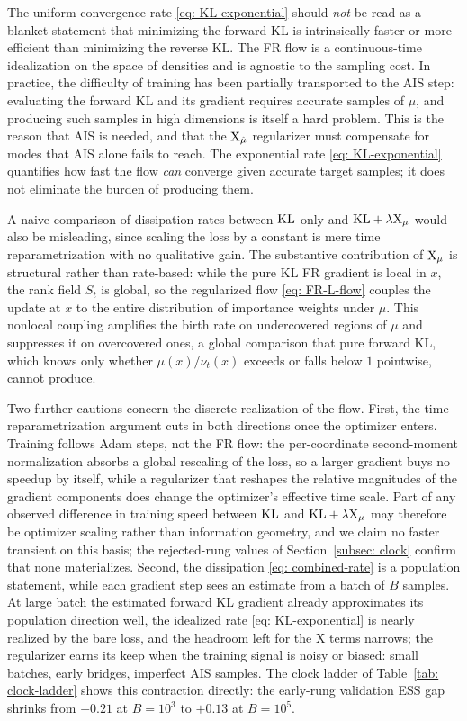 \documentclass{article}
\begin{document}
The uniform convergence rate \eqref{eq: KL-exponential} should \emph{not} be read as a blanket statement that minimizing the forward KL is intrinsically faster or more efficient than minimizing the reverse KL. The FR flow is a continuous-time idealization on the space of densities and is agnostic to the sampling cost. In practice, the difficulty of training has been partially transported to the AIS step: evaluating the forward KL and its gradient requires accurate samples of $\mu$, and producing such samples in high dimensions is itself a hard problem. This is the reason that AIS is needed, and that the $\mathrm{X}_{\hat\mu}$ regularizer must compensate for modes that AIS alone fails to reach. The exponential rate \eqref{eq: KL-exponential} quantifies how fast the flow \emph{can} converge given accurate target samples; it does not eliminate the burden of producing them.

A naive comparison of dissipation rates between $\mathrm{KL}$-only and $\mathrm{KL} + \lambda \mathrm{X}_\mu$ would also be misleading, since scaling the loss by a constant is mere time reparametrization with no qualitative gain. The substantive contribution of $\mathrm{X}_\mu$ is structural rather than rate-based: while the pure KL FR gradient is local in $x$, the rank field $S_t$ is global, so the regularized flow \eqref{eq: FR-L-flow} couples the update at $x$ to the entire distribution of importance weights under $\mu$. This nonlocal coupling amplifies the birth rate on undercovered regions of $\mu$ and suppresses it on overcovered ones, a global comparison that pure forward KL, which knows only whether $\mu(x)/\nu_t(x)$ exceeds or falls below $1$ pointwise, cannot produce.

Two further cautions concern the discrete realization of the flow. First, the time-reparametrization argument cuts in both directions once the optimizer enters. Training follows Adam steps, not the FR flow: the per-coordinate second-moment normalization absorbs a global rescaling of the loss, so a larger gradient buys no speedup by itself, while a regularizer that reshapes the relative magnitudes of the gradient components does change the optimizer's effective time scale. Part of any observed difference in training speed between $\mathrm{KL}$ and $\mathrm{KL} + \lambda \mathrm{X}_\mu$ may therefore be optimizer scaling rather than information geometry, and we claim no faster transient on this basis; the rejected-rung values of Section~\ref{subsec: clock} confirm that none materializes. Second, the dissipation \eqref{eq: combined-rate} is a population statement, while each gradient step sees an estimate from a batch of $B$ samples. At large batch the estimated forward KL gradient already approximates its population direction well, the idealized rate \eqref{eq: KL-exponential} is nearly realized by the bare loss, and the headroom left for the X terms narrows; the regularizer earns its keep when the training signal is noisy or biased: small batches, early bridges, imperfect AIS samples. The clock ladder of Table~\ref{tab: clock-ladder} shows this contraction directly: the early-rung validation ESS gap shrinks from $+0.21$ at $B = 10^3$ to $+0.13$ at $B = 10^5$.
\end{document}
